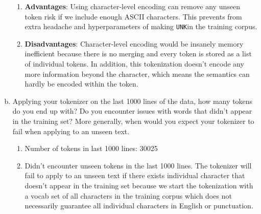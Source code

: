 \documentclass{article}
\newcommand*{\unk}{\texttt{UNK}}
\newenvironment{solution}{\color{blue}}{}
\begin{document}
\begin{enumerate}[(a)]
  \begin{solution}
    \begin{enumerate}[]
      \item \textbf{Advantages}: Using character-level encoding can remove any unseen token risk 
      if we include enough ASCII characters. This prevents from extra headache and hyperparameters
      of making \unk in the training corpus.
      \item \textbf{Disadvantages}: Character-level encoding would be insanely memory inefficient because
      there is no merging and every token is stored as a list of individual tokens. In addition,
      this tokenization doesn't encode any more information beyond the character, which means 
      the semantics can hardly be encoded within the token. 
    \end{enumerate}
  \end{solution}
  
  \item Applying your tokenizer on the last 1000 lines of the data, how many tokens 
  do you end up with? Do you encounter issues with words that didn't appear in the 
  training set? More generally, when would you expect your tokenizer to fail when 
  applying to an unseen text.

  \begin{solution}
    \begin{enumerate}[1.]
      \item Number of tokens in last 1000 lines: 30025
      \item Didn't encounter unseen tokens in the last 1000 lines. The tokenizer
      will fail to apply to an unseen text if there exists individual character 
      that doesn't appear in the training set because we start the tokenization 
      with a vocab set of all characters in the training corpus which does not 
      necessarily guarantee all individual characters in English or punctuation.
    \end{enumerate}
  \end{solution}
\end{enumerate}

\newpage
\end{document}
